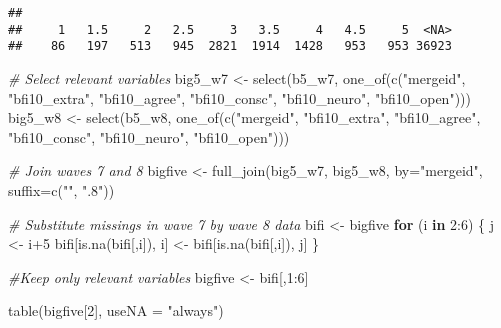 \documentclass[
]{article}
\newenvironment{Shaded}{\begin{snugshade}}{\end{snugshade}}
\newcommand{\AttributeTok}[1]{\textcolor[rgb]{0.77,0.63,0.00}{#1}}
\newcommand{\CommentTok}[1]{\textcolor[rgb]{0.56,0.35,0.01}{\textit{#1}}}
\newcommand{\ControlFlowTok}[1]{\textcolor[rgb]{0.13,0.29,0.53}{\textbf{#1}}}
\newcommand{\DecValTok}[1]{\textcolor[rgb]{0.00,0.00,0.81}{#1}}
\newcommand{\FunctionTok}[1]{\textcolor[rgb]{0.00,0.00,0.00}{#1}}
\newcommand{\NormalTok}[1]{#1}
\newcommand{\OtherTok}[1]{\textcolor[rgb]{0.56,0.35,0.01}{#1}}
\newcommand{\SpecialCharTok}[1]{\textcolor[rgb]{0.00,0.00,0.00}{#1}}
\newcommand{\StringTok}[1]{\textcolor[rgb]{0.31,0.60,0.02}{#1}}
\begin{document}
\begin{verbatim}
## 
##     1   1.5     2   2.5     3   3.5     4   4.5     5  <NA> 
##    86   197   513   945  2821  1914  1428   953   953 36923
\end{verbatim}

\begin{Shaded}
\begin{Highlighting}[]
\CommentTok{\# Select relevant variables }
\NormalTok{big5\_w7 }\OtherTok{\textless{}{-}} \FunctionTok{select}\NormalTok{(b5\_w7, }\FunctionTok{one\_of}\NormalTok{(}\FunctionTok{c}\NormalTok{(}\StringTok{"mergeid"}\NormalTok{, }\StringTok{"bfi10\_extra"}\NormalTok{, }\StringTok{"bfi10\_agree"}\NormalTok{, }\StringTok{"bfi10\_consc"}\NormalTok{, }\StringTok{"bfi10\_neuro"}\NormalTok{, }\StringTok{"bfi10\_open"}\NormalTok{)))}
\NormalTok{big5\_w8 }\OtherTok{\textless{}{-}} \FunctionTok{select}\NormalTok{(b5\_w8, }\FunctionTok{one\_of}\NormalTok{(}\FunctionTok{c}\NormalTok{(}\StringTok{"mergeid"}\NormalTok{, }\StringTok{"bfi10\_extra"}\NormalTok{, }\StringTok{"bfi10\_agree"}\NormalTok{, }\StringTok{"bfi10\_consc"}\NormalTok{, }\StringTok{"bfi10\_neuro"}\NormalTok{, }\StringTok{"bfi10\_open"}\NormalTok{)))}


\CommentTok{\# Join waves 7 and 8}
\NormalTok{bigfive }\OtherTok{\textless{}{-}} \FunctionTok{full\_join}\NormalTok{(big5\_w7, big5\_w8, }\AttributeTok{by=}\StringTok{"mergeid"}\NormalTok{, }\AttributeTok{suffix=}\FunctionTok{c}\NormalTok{(}\StringTok{""}\NormalTok{, }\StringTok{".8"}\NormalTok{))}

\CommentTok{\# Substitute missings in wave 7 by wave 8 data}
\NormalTok{bifi }\OtherTok{\textless{}{-}}\NormalTok{ bigfive}
\ControlFlowTok{for}\NormalTok{ (i }\ControlFlowTok{in} \DecValTok{2}\SpecialCharTok{:}\DecValTok{6}\NormalTok{) \{}
\NormalTok{  j }\OtherTok{\textless{}{-}}\NormalTok{ i}\SpecialCharTok{+}\DecValTok{5}
\NormalTok{  bifi[}\FunctionTok{is.na}\NormalTok{(bifi[,i]), i] }\OtherTok{\textless{}{-}}\NormalTok{ bifi[}\FunctionTok{is.na}\NormalTok{(bifi[,i]), j]}
\NormalTok{\}}

\CommentTok{\#Keep only relevant variables}
\NormalTok{bigfive }\OtherTok{\textless{}{-}}\NormalTok{ bifi[,}\DecValTok{1}\SpecialCharTok{:}\DecValTok{6}\NormalTok{]}

\FunctionTok{table}\NormalTok{(bigfive[}\DecValTok{2}\NormalTok{], }\AttributeTok{useNA =} \StringTok{"always"}\NormalTok{)}
\end{Highlighting}
\end{Shaded}
\end{document}
